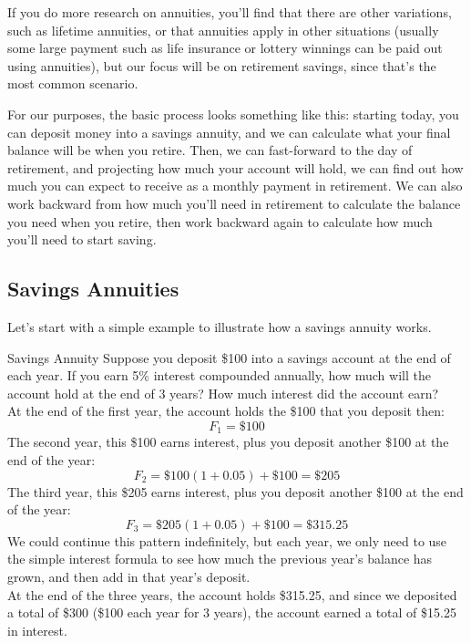 If you do more research on annuities, you'll find that there are other variations, such as lifetime annuities, or that annuities apply in other situations (usually some large payment such as life insurance or lottery winnings can be paid out using annuities), but our focus will be on retirement savings, since that's the most common scenario.

For our purposes, the basic process looks something like this: starting today, you can deposit money into a savings annuity, and we can calculate what your final balance will be when you retire.  Then, we can fast-forward to the day of retirement, and projecting how much your account will hold, we can find out how much you can expect to receive as a monthly payment in retirement.  We can also work backward from how much you'll need in retirement to calculate the balance you need when you retire, then work backward again to calculate how much you'll need to start saving.
\vfill
\pagebreak

\subsection{Savings Annuities}

Let's start with a simple example to illustrate how a savings annuity works.

\begin{example}[https://www.youtube.com/watch?v=KOIRAWGh9vM&list=PLfmpjsIzhztsZtnb7HnXrQ8SLoiOCIcAM&index=25]{Savings Annuity}
Suppose you deposit \$100 into a savings account at the end of each year.  If you earn 5\% interest compounded annually, how much will the account hold at the end of 3 years?  How much interest did the account earn?\\

At the end of the first year, the account holds the \$100 that you deposit then:
\[F_1 = \$100\]
The second year, this \$100 earns interest, plus you deposit another \$100 at the end of the year:
\[F_2 = \$100(1+0.05) + \$100 = \$205\]
The third year, this \$205 earns interest, plus you deposit another \$100 at the end of the year:
\[F_3 = \$205(1+0.05) + \$100 = \$315.25\]
We could continue this pattern indefinitely, but each year, we only need to use the simple interest formula to see how much the previous year's balance has grown, and then add in that year's deposit.\\

At the end of the three years, the account holds \$315.25, and since we deposited a total of \$300 (\$100 each year for 3 years), the account earned a total of \$15.25 in interest.
\end{example}

